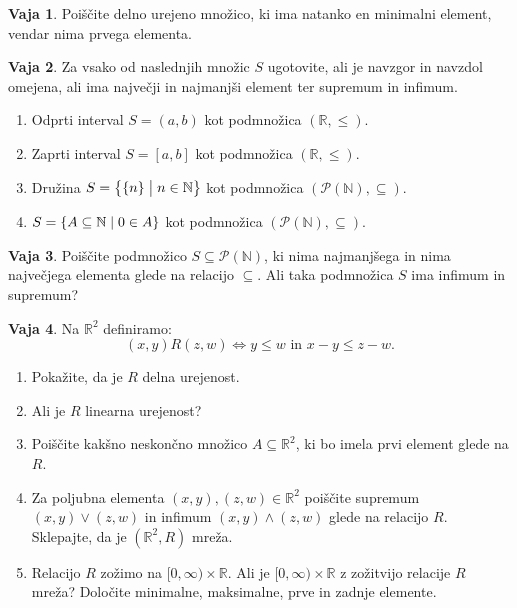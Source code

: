 \documentclass{article}
\newcommand{\pow}{\mathcal{P}}
\newcommand{\NN}{\mathbb{N}}
\newcommand{\RR}{\mathbb{R}}
\theoremstyle{definition}
\newtheorem{vaja}{Vaja}
\begin{document}
\begin{vaja}
  Poiščite delno urejeno množico, ki ima natanko en minimalni element, vendar nima prvega elementa.
\end{vaja}

\begin{vaja}
  Za vsako od naslednjih množic $S$ ugotovite, ali je navzgor in navzdol omejena, ali ima največji in najmanjši element ter supremum in infimum.
  \begin{enumerate}
    \item
      Odprti interval $S = (a,b)$ kot podmnožica $(\RR, \leq)$.
    \item
      Zaprti interval $S = [a,b]$ kot podmnožica $(\RR, \leq)$.
    \item
      Družina $S = \set[1]{\set{n}}{n \in \NN}$ kot podmnožica $(\pow(\NN), \subseteq)$.
    \item
      $S = \set{A \subseteq \NN}{0 \in A}$ kot podmnožica $(\pow(\NN), \subseteq)$.
  \end{enumerate}
\end{vaja}

\begin{vaja}
  Poiščite podmnožico $S \subseteq \pow(\NN)$, ki nima najmanjšega in nima največjega elementa glede na relacijo $\subseteq$. Ali taka podmnožica $S$ ima infimum in supremum?
\end{vaja}

\begin{vaja}
  Na $\RR^2$ definiramo:
  \[(x,y) R (z,w) \iff y \leq w \text{ in } x - y \leq z - w.\]
  \begin{enumerate}
    \item
      Pokažite, da je $R$ delna urejenost.
    \item
      Ali je $R$ linearna urejenost?
    \item
      Poiščite kakšno neskončno množico $A \subseteq \RR^2$, ki bo imela prvi element glede na $R$.
    \item
      Za poljubna elementa $(x,y), (z,w) \in \RR^2$ poiščite supremum $(x,y) \vee (z,w)$ in infimum $(x,y) \wedge (z,w)$ glede na relacijo $R$. Sklepajte, da je $(\RR^2, R)$ mreža.
    \item
      Relacijo $R$ zožimo na $[0, \infty) \times \RR$. Ali je $[0, \infty) \times \RR$ z zožitvijo relacije $R$ mreža? Določite minimalne, maksimalne, prve in zadnje elemente.
  \end{enumerate}
\end{vaja}
\end{document}
